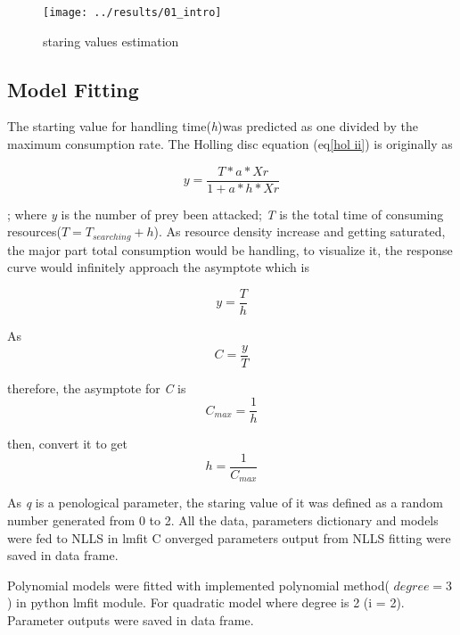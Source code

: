 \documentclass[11pt, a4paper]{article}
\begin{document}
\begin{figure}\label{fig1}
	\centering
	\texttt{[image: ../results/01\_intro]}
	\caption{staring values estimation}
	\label{staring values selection}
\end{figure}
\subsection{Model Fitting}
\vspace{0.1\baselineskip}
The starting value for handling time(\textit{h})was predicted as one divided by the maximum consumption rate. The Holling disc equation (eq\ref{hol ii}) is originally as 

\begin{equation}\label{hol disc}
y = \frac{T *a *Xr }{1+a*h*Xr}
\end{equation}

; where \textit{y} is the number of prey been attacked; \textit{T} is the total time of consuming resources($T = T_{searching} + h$). As resource density increase and getting saturated, the major part total consumption would be handling, to visualize it, the response curve would infinitely approach the asymptote which is 

\begin{equation}\label{est h}
y = \frac{T}{h}
\end{equation}

As  
\begin{equation}\label{con rate}
C = \frac{y}{T}
\end{equation}

 therefore, the asymptote for \textit{C} is
  \begin{equation}\label{key}
  C_{max}= \frac{1}{h}
  \end{equation}
  
   then, convert it to get 
   \begin{equation}\label{key}
   h = \frac{1}{C_{max}}
   \end{equation}

As \textit{q} is a penological parameter, the staring value of it was defined as a random number generated from 0 to 2. All the data, parameters dictionary and models were fed to NLLS in lmfit 
C
onverged parameters output from NLLS fitting were saved in data frame.
 
Polynomial models were fitted with implemented polynomial method( $degree = 3$) in python lmfit module. For quadratic model where degree is 2 (i = 2). Parameter outputs were saved in data frame.
\end{document}
